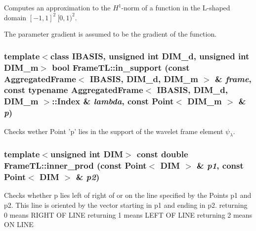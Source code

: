 Computes an approximation to the $H^1$-norm of a function in the L-shaped domain $[-1,1]^2 \ [0,1)^2$. 

The parameter gradient is assumed to be the gradient of the function. \hypertarget{namespaceFrameTL_0699f5e7931ab40bf346b17e6c3bde01}{
\subsubsection[in\_\-support]{\setlength{\rightskip}{0pt plus 5cm}template$<$class IBASIS, unsigned int DIM\_\-d, unsigned int DIM\_\-m$>$ bool FrameTL::in\_\-support (const AggregatedFrame$<$ IBASIS, DIM\_\-d, DIM\_\-m $>$ \& {\em frame}, \/  const typename AggregatedFrame$<$ IBASIS, DIM\_\-d, DIM\_\-m $>$::Index \& {\em lambda}, \/  const Point$<$ DIM\_\-m $>$ \& {\em p})}}
\label{namespaceFrameTL_0699f5e7931ab40bf346b17e6c3bde01}


Checks wether Point 'p' lies in the support of the wavelet frame element $\psi_\lambda$. \hypertarget{namespaceFrameTL_b442ddca04900a00608a3963348b15bb}{
\subsubsection[inner\_\-prod]{\setlength{\rightskip}{0pt plus 5cm}template$<$unsigned int DIM$>$ const double FrameTL::inner\_\-prod (const Point$<$ DIM $>$ \& {\em p1}, \/  const Point$<$ DIM $>$ \& {\em p2})}}
\label{namespaceFrameTL_b442ddca04900a00608a3963348b15bb}


Checks whether p lies left of right of or on the line specified by the Points p1 and p2. This line is oriented by the vector starting in p1 and ending in p2. returning 0 means RIGHT OF LINE returning 1 means LEFT OF LINE returning 2 means ON LINE

